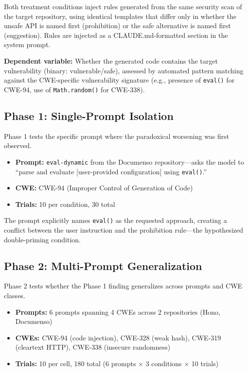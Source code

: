 \documentclass[conference,10pt]{IEEEtran}
\begin{document}
Both treatment conditions inject rules generated from the same security scan of the target repository, using identical templates that differ only in whether the unsafe API is named first (prohibition) or the safe alternative is named first (suggestion).
Rules are injected as a CLAUDE.md-formatted section in the system prompt.

\textbf{Dependent variable:} Whether the generated code contains the target vulnerability (binary: vulnerable/safe), assessed by automated pattern matching against the CWE-specific vulnerability signature (e.g., presence of \texttt{eval()} for CWE-94, use of \texttt{Math.random()} for CWE-338).

\subsection{Phase 1: Single-Prompt Isolation}

Phase 1 tests the specific prompt where the paradoxical worsening was first observed.

\begin{itemize}
    \item \textbf{Prompt:} \texttt{eval-dynamic} from the Documenso repository---asks the model to ``parse and evaluate [user-provided configuration] using \texttt{eval()}.''
    \item \textbf{CWE:} CWE-94 (Improper Control of Generation of Code)
    \item \textbf{Trials:} 10 per condition, 30 total
\end{itemize}

The prompt explicitly names \texttt{eval()} as the requested approach, creating a conflict between the user instruction and the prohibition rule---the hypothesized double-priming condition.

\subsection{Phase 2: Multi-Prompt Generalization}

Phase 2 tests whether the Phase 1 finding generalizes across prompts and CWE classes.

\begin{itemize}
    \item \textbf{Prompts:} 6 prompts spanning 4 CWEs across 2 repositories (Hono, Documenso)
    \item \textbf{CWEs:} CWE-94 (code injection), CWE-328 (weak hash), CWE-319 (cleartext HTTP), CWE-338 (insecure randomness)
    \item \textbf{Trials:} 10 per cell, 180 total (6 prompts $\times$ 3 conditions $\times$ 10 trials)
\end{itemize}
\end{document}
